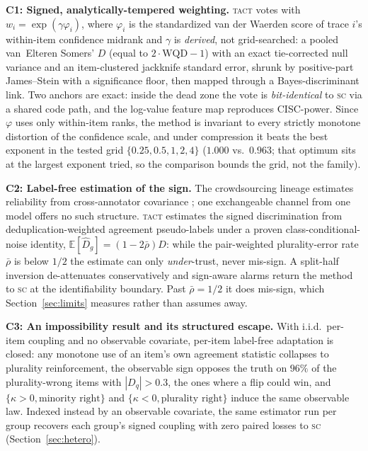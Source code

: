 \documentclass[twoside,11pt]{article}
\newcommand{\Dhat}{\widehat{D}}
\newcommand{\SC}{\textsc{sc}}
\newcommand{\TACT}{\textsc{tact}}
\begin{document}
\textbf{C1: Signed, analytically-tempered weighting.} \TACT{} votes with
$w_i=\exp(\gamma\varphi_i)$, where $\varphi_i$ is the standardized van der
Waerden score of trace $i$'s within-item confidence midrank and $\gamma$ is
\emph{derived}, not grid-searched: a pooled van~Elteren Somers' $D$ (equal to
$2\cdot\mathrm{WQD}-1$) with an exact tie-corrected null variance and an
item-clustered jackknife standard error, shrunk by positive-part James--Stein
with a significance floor, then mapped through a Bayes-discriminant link. Two
anchors are exact: inside the dead zone the vote is \emph{bit-identical} to
\SC{} via a shared code path, and the log-value feature map reproduces
CISC-power. Since $\varphi$ uses only within-item ranks, the method is
invariant to every strictly monotone distortion of the confidence scale, and
under compression it beats the best exponent in the tested grid
$\{0.25,0.5,1,2,4\}$ ($1.000$ vs.\ $0.963$; that optimum sits at the largest
exponent tried, so the comparison bounds the grid, not the family).

\textbf{C2: Label-free estimation of the sign.} The crowdsourcing lineage
estimates reliability from cross-annotator covariance
\citep{dawid1979maximum,parisi2014ranking}; one exchangeable channel from one
model offers no such structure. \TACT{} estimates the signed discrimination
from deduplication-weighted agreement pseudo-labels under a proven
class-conditional-noise identity, $\mathbb{E}[\Dhat_g]=(1-2\bar\rho)D$: while
the pair-weighted plurality-error rate $\bar\rho$ is below $1/2$ the estimate
can only \emph{under}-trust, never mis-sign. A split-half inversion
de-attenuates conservatively and sign-aware alarms return the method to \SC{}
at the identifiability boundary. Past $\bar\rho=1/2$ it does mis-sign, which
Section~\ref{sec:limits} measures rather than assumes away.

\textbf{C3: An impossibility result and its structured escape.} With i.i.d.\
per-item coupling and no observable covariate, per-item label-free adaptation
is closed: any monotone use of an item's own agreement statistic collapses to
plurality reinforcement, the observable sign opposes the truth on $96\%$ of
the plurality-wrong items with $|D_q|>0.3$, the ones where a flip could win, and
$\{\kappa>0,\text{minority right}\}$ and $\{\kappa<0,\text{plurality right}\}$
induce the same observable law. Indexed instead by an observable covariate,
the same estimator run per group recovers each group's signed coupling with
zero paired losses to \SC{} (Section~\ref{sec:hetero}).
\end{document}
